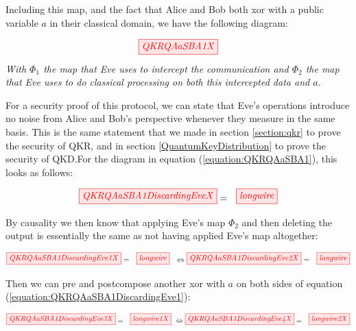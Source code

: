 \documentclass[]{article}
\begin{document}
Including this map, and the fact that Alice and Bob both xor with a public variable $a$ in their classical domain, we have the following diagram:

\begin{equation}
	\label{equation:QKRQAaSBA1}
	\tikzfig{QKRQAaSBA1X}
\end{equation}
\textit{With $\Phi_1$ the map that Eve uses to intercept the communication and $\Phi_2$ the map that Eve uses to do classical processing on both this intercepted data and $a$.}

For a security proof of this protocol, we can state that Eve's operations introduce no noise from Alice and Bob's perspective whenever they measure in the same basis. This is the same statement that we made in section \ref{section:qkr} to prove the security of QKR, and in section \ref{QuantumKeyDistribution} to prove the security of QKD.For the diagram in equation (\ref{equation:QKRQAaSBA1}), this looks as follows:

\begin{equation}
\label{equation:QAaSBProofSetupReal}
\tikzfig{QKRQAaSBA1DiscardingEveX} = ~~ \tikzfig{longwire}
\end{equation}

By causality we then know that applying Eve's map $\Phi_2$ and then deleting the output is essentially the same as not having applied Eve's map altogether:

\begin{equation}
\label{equation:QKRQAaSBA1DiscardingEve1}
\tikzfig{QKRQAaSBA1DiscardingEve1X} = ~~ \tikzfig{longwire}
~~\Leftrightarrow
\tikzfig{QKRQAaSBA1DiscardingEve2X} = ~~ \tikzfig{longwire}
\end{equation}

Then we can pre and postcompose another xor with $a$ on both sides of equation (\ref{equation:QKRQAaSBA1DiscardingEve1}):

\begin{equation}\\
\label{equation:QKRQAaSBA1DiscardingEve3}
\tikzfig{QKRQAaSBA1DiscardingEve3X} = ~~ \tikzfig{longwire1X} ~
\Leftrightarrow
\tikzfig{QKRQAaSBA1DiscardingEve4X} = ~~ \tikzfig{longwire2X}
\end{equation}
\end{document}
